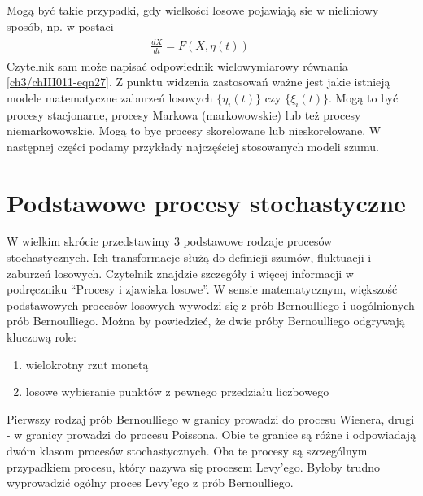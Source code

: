\documentclass[a4paper,12pt,polish]{sphinxmanual}
\begin{document}
Mogą być takie przypadki, gdy wielkości losowe pojawiają sie w nieliniowy sposób, np. w postaci
\label{ch3/chIII011:equation-eqn27}\begin{gather}
\begin{split} \frac{dX}{dt} = F(X, \eta(t)) \qquad\end{split}\label{ch3/chIII011-eqn27}
\end{gather}
Czytelnik sam może napisać odpowiednik wielowymiarowy równania \eqref{ch3/chIII011-eqn27}. Z punktu widzenia zastosowań ważne jest jakie istnieją modele matematyczne zaburzeń losowych $\{\eta_i(t)\}$ czy $\{\xi_i(t)\}$. Mogą to być procesy stacjonarne, procesy Markowa (markowowskie) lub też procesy niemarkowowskie. Mogą to byc procesy skorelowane lub nieskorelowane. W następnej części podamy przykłady najczęściej stosowanych modeli szumu.


\section{Podstawowe procesy stochastyczne}
\label{ch3/chIII021::doc}\label{ch3/chIII021:podstawowe-procesy-stochastyczne}
W wielkim skrócie przedstawimy 3 podstawowe rodzaje procesów stochastycznych. Ich transformacje służą do definicji szumów, fluktuacji i zaburzeń losowych. Czytelnik znajdzie szczegóły i więcej informacji w podręczniku ``Procesy i zjawiska losowe''.  W sensie matematycznym, większość podstawowych procesów losowych wywodzi się z prób Bernoulliego i uogólnionych prób Bernoulliego. Można by powiedzieć, że dwie próby Bernoulliego odgrywają kluczową role:
\begin{enumerate}
\item {} 
wielokrotny rzut monetą

\item {} 
losowe wybieranie punktów z pewnego przedziału liczbowego

\end{enumerate}

Pierwszy rodzaj prób Bernoulliego w granicy prowadzi do procesu Wienera, drugi - w granicy prowadzi do procesu Poissona. Obie te granice są różne i odpowiadają dwóm klasom procesów stochastycznych. Oba te procesy są szczególnym przypadkiem procesu, który nazywa się procesem Levy'ego. Byłoby trudno wyprowadzić ogólny proces Levy'ego z prób Bernoulliego.
\end{document}
